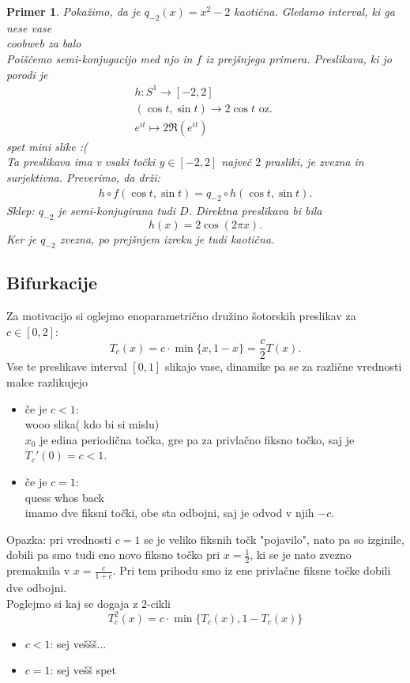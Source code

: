 \documentclass{article}
\newtheorem{primer}{Primer}
\begin{document}
\begin{primer}
Pokažimo, da je $q_{-2}(x) = x^2 - 2$ kaotična. Gledamo interval, ki ga nese vase\\ 
coobweb za balo\\ 
Poiščemo semi-konjugacijo med njo in $f$ iz prejšnjega primera. Preslikava, ki jo porodi je 
\begin{align*}
h: S^1 \rightarrow [-2, 2] \\ 
(\cos{t}, \sin{t}) \rightarrow 2\cos{t} \text{ oz. }\\ 
e^{it} \mapsto 2\Re(e^{it}) 
\end{align*}
spet mini slike :(\\ 
Ta preslikava ima v vsaki točki $y\in [-2, 2]$ največ $2$ prasliki, je zvezna in surjektivna. Preverimo, da drži:
\begin{align*}
h\circ f(\cos{t}, \sin{t}) = q_{-2} \circ h(\cos{t}, \sin{t}).
\end{align*}
Sklep: $q_{-2}$ je semi-konjugirana tudi $D$. Direktna preslikava bi bila 
$$
h(x) = 2\cos(2\pi x).
$$
Ker je $q_{-2}$ zvezna, po prejšnjem izreku je tudi kaotična.
\end{primer}

\subsection{Bifurkacije}

Za motivacijo si oglejmo enoparametrično družino šotorskih preslikav za $c\in [0, 2]$:
$$
T_c(x) = c\cdot \min\{x, 1-x\} = \frac{c}{2} T(x).
$$
Vse te preslikave interval $[0, 1]$ slikajo vase, dinamike pa se za različne vrednosti malce razlikujejo
\begin{itemize}
\item če je $c < 1$: \\
wooo slika( kdo bi si mislu)\\ 
$x_0$ je edina periodična točka, gre pa za privlačno fiksno točko, saj je $T_c'(0) = c < 1$.
\item če je $c = 1$: \\ 
quess whos back \\ 
imamo dve fiksni točki, obe sta odbojni, saj je odvod v njih $-c$.
\end{itemize}
Opazka: pri vrednosti $c=1$ se je veliko fiksnih točk
"pojavilo", nato pa so izginile, dobili pa smo tudi eno novo fiksno točko pri $x = \frac{1}{2}$, ki se je nato zvezno premaknila v $x = \frac{c}{1 + c}$. Pri tem prihodu smo iz ene privlačne fiksne točke dobili dve odbojni.\\ 
Poglejmo si kaj se dogaja z $2$-cikli 
$$
T_c^2(x) = c\cdot \min\{ T_c(x), 1 - T_c(x)\}
$$
\begin{itemize}
\item $c < 1$: sej veššš... 
\item $c = 1$: sej vešš spet
\end{itemize}
\end{document}
